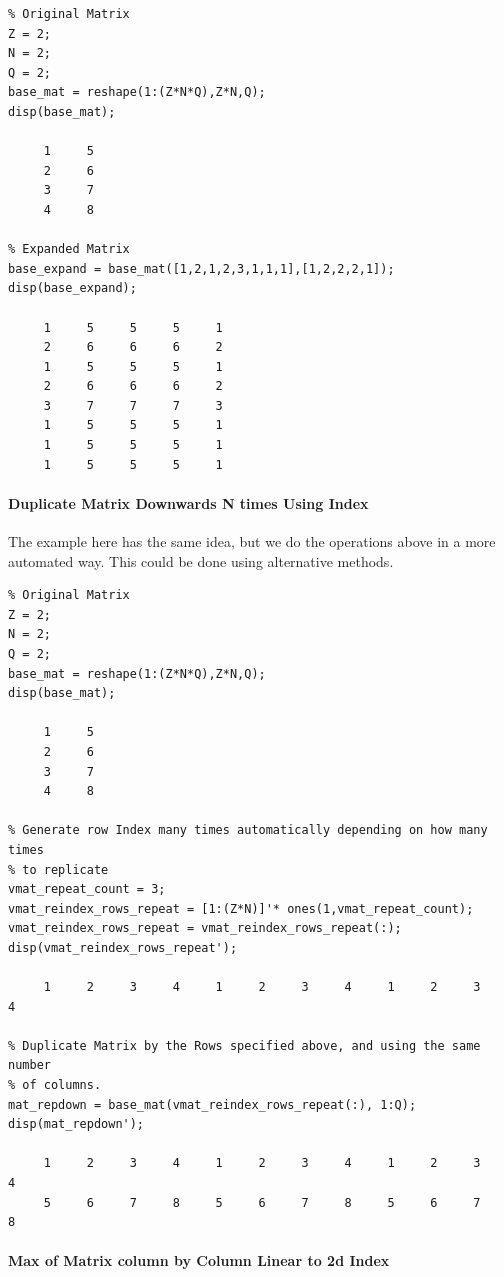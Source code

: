 \documentclass[
]{book}
\begin{document}
\begin{verbatim}
% Original Matrix
Z = 2;
N = 2;
Q = 2;
base_mat = reshape(1:(Z*N*Q),Z*N,Q);
disp(base_mat);

     1     5
     2     6
     3     7
     4     8

% Expanded Matrix
base_expand = base_mat([1,2,1,2,3,1,1,1],[1,2,2,2,1]);
disp(base_expand);

     1     5     5     5     1
     2     6     6     6     2
     1     5     5     5     1
     2     6     6     6     2
     3     7     7     7     3
     1     5     5     5     1
     1     5     5     5     1
     1     5     5     5     1
\end{verbatim}

\hypertarget{duplicate-matrix-downwards-n-times-using-index}{%
\paragraph{Duplicate Matrix Downwards N times Using Index}\label{duplicate-matrix-downwards-n-times-using-index}}

The example here has the same idea, but we do the operations above in a
more automated way. This could be done using alternative methods.

\begin{verbatim}
% Original Matrix
Z = 2;
N = 2;
Q = 2;
base_mat = reshape(1:(Z*N*Q),Z*N,Q);
disp(base_mat);

     1     5
     2     6
     3     7
     4     8

% Generate row Index many times automatically depending on how many times
% to replicate
vmat_repeat_count = 3;
vmat_reindex_rows_repeat = [1:(Z*N)]'* ones(1,vmat_repeat_count);
vmat_reindex_rows_repeat = vmat_reindex_rows_repeat(:);
disp(vmat_reindex_rows_repeat');

     1     2     3     4     1     2     3     4     1     2     3     4

% Duplicate Matrix by the Rows specified above, and using the same number
% of columns.
mat_repdown = base_mat(vmat_reindex_rows_repeat(:), 1:Q);
disp(mat_repdown');

     1     2     3     4     1     2     3     4     1     2     3     4
     5     6     7     8     5     6     7     8     5     6     7     8
\end{verbatim}

\hypertarget{max-of-matrix-column-by-column-linear-to-2d-index}{%
\paragraph{Max of Matrix column by Column Linear to 2d Index}\label{max-of-matrix-column-by-column-linear-to-2d-index}}
\end{document}
